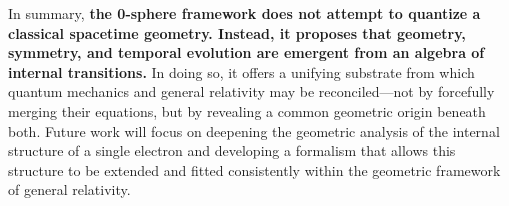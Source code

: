 \documentclass[%
 reprint,
 amsmath,amssymb,
 aps,
]{revtex4-1}
\numberwithin{equation}{section}%
\begin{document}
In summary, \textbf{the 0-sphere framework does not attempt to quantize a classical spacetime geometry. Instead, it proposes that geometry, symmetry, and temporal evolution are emergent from an algebra of internal transitions.} In doing so, it offers a unifying substrate from which quantum mechanics and general relativity may be reconciled—not by forcefully merging their equations, but by revealing a common geometric origin beneath both. Future work will focus on deepening the geometric analysis of the internal structure of a single electron and developing a formalism that allows this structure to be extended and fitted consistently within the geometric framework of general relativity.

\clearpage

\end{document}
